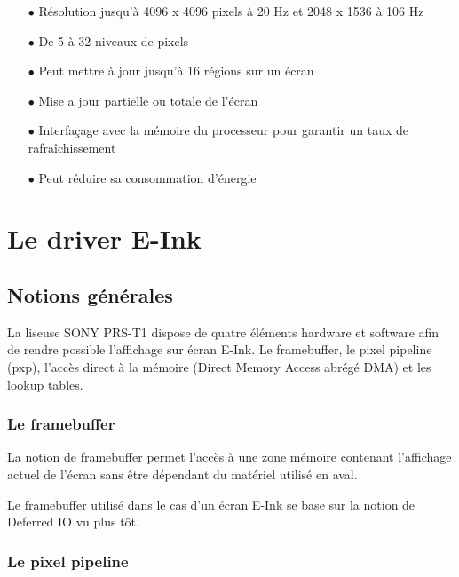 \begin{itemize}
	\item[$\bullet$] Résolution jusqu'à 4096 x 4096 pixels à 20 Hz et 2048 x 1536 à 106 Hz
	\item[$\bullet$] De 5 à 32 niveaux de pixels
	\item[$\bullet$] Peut mettre à jour jusqu'à 16 régions sur un écran
	\item[$\bullet$] Mise a jour partielle ou totale de l'écran 
	\item[$\bullet$] Interfaçage avec la mémoire du processeur pour garantir un taux de rafraîchissement
	\item[$\bullet$] Peut réduire sa consommation d'énergie
\end{itemize}


\newpage
\section{Le driver E-Ink}

\subsection{Notions générales}
La liseuse SONY PRS-T1 dispose de quatre éléments hardware et software afin 
de rendre possible l'affichage sur écran E-Ink. Le framebuffer, le pixel pipeline (pxp), l'accès direct à la mémoire (Direct Memory Access abrégé DMA) et les lookup tables.

\subsubsection{Le framebuffer}

La notion de framebuffer permet l'accès à une zone mémoire contenant l'affichage  actuel de l'écran sans être dépendant du matériel utilisé en aval.

Le framebuffer utilisé dans le cas d'un écran E-Ink se base sur la notion de Deferred IO vu plus tôt.

\subsubsection{Le pixel pipeline}


